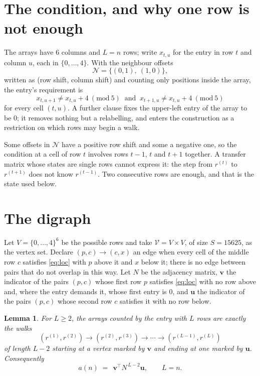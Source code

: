 \documentclass[11pt,a4paper]{article}
\theoremstyle{plain}
\newtheorem{lemma}[theorem]{Lemma}
\theoremstyle{definition}
\begin{document}
\section{The condition, and why one row is not enough}

The arrays have $6$ columns and $L=n$ rows; write $x_{t,u}$ for the entry in
row $t$ and column $u$, each in $\{0,\dots,4\}$. With the neighbour offsets
\[
\mathcal N=\{(0,1),\ (1,0)\},
\]
written as (row shift, column shift) and counting only positions inside the array, the
entry's requirement is
\begin{equation}\label{eq:loc}
x_{t,u+1}\ne x_{t,u}+4\ (\mathrm{mod}\ 5)\ \text{ and }\ x_{t+1,u}\ne x_{t,u}+4\ (\mathrm{mod}\ 5)
\end{equation}
for every cell $(t,u)$. A further clause fixes the upper-left entry of the array to be $0$; it removes nothing but a relabelling, and enters the construction as a restriction on which rows may begin a walk.

Some offsets in $\mathcal N$ have a positive row shift and some a negative one, so the
condition at a cell of row $t$ involves rows $t-1$, $t$ and $t+1$ together. A transfer
matrix whose states are single rows cannot express it: the step from $r^{(t)}$ to
$r^{(t+1)}$ does not know $r^{(t-1)}$. Two consecutive rows are enough, and that is
the state used below.

\section{The digraph}

Let $V=\{0,\dots,4\}^{6}$ be the possible rows and take
$\mathcal V=V\times V$, of size $S=15625$, as the vertex set. Declare $(p,c)\to(c,x)$ an edge
when every cell of the middle row $c$ satisfies \eqref{eq:loc} with $p$ above it and $x$
below it; there is no edge between pairs that do not overlap in this way. Let $N$ be the
adjacency matrix, $\mathbf{v}$ the indicator of the pairs $(p,c)$ whose first row $p$
satisfies \eqref{eq:loc} with no row above and, where the entry demands it, whose first entry is $0$, and $\mathbf{u}$ the indicator of
the pairs $(p,c)$ whose second row $c$ satisfies it with no row below.

\begin{lemma}\label{lem:walk}
For $L\ge2$, the arrays counted by the entry with $L$ rows are exactly the walks
\[
(r^{(1)},r^{(2)})\to(r^{(2)},r^{(3)})\to\cdots\to(r^{(L-1)},r^{(L)})
\]
of length $L-2$ starting at a vertex marked by $\mathbf{v}$ and ending at one marked by
$\mathbf{u}$. Consequently
\[
a(n)\;=\;\,\mathbf{v}^{\!\top}N^{\,L-2}\mathbf{u},\qquad L=n .
\]
\end{lemma}
\end{document}
